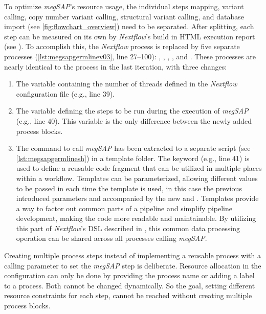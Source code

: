 To optimize \textit{\ac{megSAP}}'s resource usage, the individual steps \textemdash mapping, variant calling, copy number variant calling, structural variant calling, and database import (see \cref{fig:flowchart_overview}) \textemdash need to be separated. After splitting, each step can be measured on its own by \textit{Nextflow}'s build in HTML execution report (see \autocite{SeqeraLabs2022a}). To accomplish this, the \textit{Nextflow} process  is replaced by five separate processes (\cref{lst:megsapgermlinev03}, line \numrange{27}{100}): , , , , and . These processes are nearly identical to the  process in the last iteration, with three changes:
\begin{enumerate}
    \item The variable  containing the number of threads defined in the \textit{Nextflow} configuration file (e.g., line 39).
    \item The variable  defining the steps to be run during the execution of \textit{\ac{megSAP}} (e.g., line 40). This variable is the only difference between the newly added process blocks.
    \item The command to call \textit{\ac{megSAP}} has been extracted to a separate script (see \cref{lst:megsapgermlinesh}) in a template folder. The  keyword (e.g., line 41) is used to define a reusable code fragment that can be utilized in multiple places within a workflow. Templates can be parameterized, allowing different values to be passed in each time the template is used, in this case the previous introduced parameters  and  accompanied by the new  and . Templates provide a way to factor out common parts of a pipeline and simplify pipeline development, making the code more readable and maintainable. By utilizing this part of \textit{Nextflow}'s \ac{DSL} described in \autocite[Module templates]{SeqeraLabs2022}, this common data processing operation can be shared across all processes calling \textit{\ac{megSAP}}.
\end{enumerate}
Creating multiple process steps instead of implementing a reusable process with a calling parameter to set the \textit{\ac{megSAP}} step is deliberate. Resource allocation in the configuration can only be done by providing the process name or adding a label to a process. Both cannot be changed dynamically. So the goal, setting different resource constraints for each step, cannot be reached without creating multiple process blocks.

